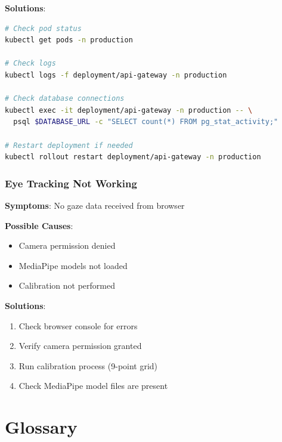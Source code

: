 \documentclass[11pt,letterpaper]{article}
\begin{document}
\textbf{Solutions}:
\begin{lstlisting}[language=bash]
# Check pod status
kubectl get pods -n production

# Check logs
kubectl logs -f deployment/api-gateway -n production

# Check database connections
kubectl exec -it deployment/api-gateway -n production -- \
  psql $DATABASE_URL -c "SELECT count(*) FROM pg_stat_activity;"

# Restart deployment if needed
kubectl rollout restart deployment/api-gateway -n production
\end{lstlisting}

\subsubsection{Eye Tracking Not Working}

\textbf{Symptoms}: No gaze data received from browser

\textbf{Possible Causes}:
\begin{itemize}
    \item Camera permission denied
    \item MediaPipe models not loaded
    \item Calibration not performed
\end{itemize}

\textbf{Solutions}:
\begin{enumerate}
    \item Check browser console for errors
    \item Verify camera permission granted
    \item Run calibration process (9-point grid)
    \item Check MediaPipe model files are present
\end{enumerate}


\section{Glossary}
\end{document}
